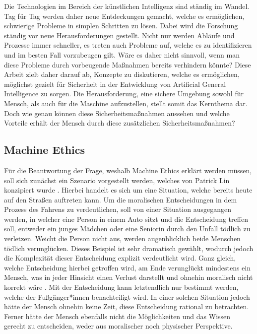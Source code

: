             Die Technologien im Bereich der künstlichen Intelligenz sind ständig im Wandel. Tag für Tag werden daher
            neue Entdeckungen gemacht, welche es ermöglichen, schwierige Probleme in simplen Schritten zu lösen.
            Dabei wird die Forschung ständig vor neue Herausforderungen gestellt. Nicht nur werden Abläufe und Prozesse
            immer schneller, es treten auch Probleme auf, welche es zu identifizieren und im besten Fall vorzubeugen gilt.
            Wäre es daher nicht sinnvoll, wenn man diese Probleme durch vorbeugende Maßnahmen bereits verhindern könnte?
            Diese Arbeit zielt daher darauf ab, Konzepte zu diskutieren, welche es ermöglichen, möglichst gezielt für
            Sicherheit in der Entwicklung von Artificial General Intelligence zu sorgen. Die Herausforderung, eine sichere
            Umgebung sowohl für Mensch, als auch für die Maschine aufzustellen, stellt somit das Kernthema dar. Doch wie
            genau können diese Sicherheitsmaßnahmen aussehen und welche Vorteile erhält der Mensch durch diese zusätzlichen
            Sicherheitsmaßnahmen?

        \subsection{Machine Ethics}
            Für die Beantwortung der Frage, weshalb Machine Ethics erklärt werden müssen, soll sich zunächst ein Szenario
            vorgestellt werden, welches von Patrick Lin konzipiert wurde \cite[s. 70]{maurer_gerdes_lenz_winner_2015}.
            Hierbei handelt es sich um eine Situation, welche bereits heute auf den Straßen auftreten kann. Um die
            moralischen Entscheidungen in dem Prozess des Fahrens zu verdeutlichen, soll von einer Situation ausgegangen
            werden, in welcher eine Person in einem Auto sitzt und die Entscheidung treffen soll, entweder ein junges
            Mädchen oder eine Seniorin durch den Unfall tödlich zu verletzen. Weicht die Person nicht aus, werden augenblicklich
            beide Menschen tödlich verunglücken. Dieses Beispiel ist sehr dramatisch gewählt, wodurch jedoch die Komplexität
            dieser Entscheidung explizit verdeutlicht wird. Ganz gleich, welche Entscheidung hierbei getroffen wird, am
            Ende verunglückt mindestens ein Mensch, was in jeder Hinsicht einen Verlust darstellt und ohnehin moralisch
            nicht korrekt wäre \cite[s. 70]{maurer_gerdes_lenz_winner_2015}. Mit der Entscheidung kann letztendlich nur
            bestimmt werden, welche der Fußgänger*innen benachteiligt wird. In einer solchen Situation jedoch hätte der
            Mensch ohnehin keine Zeit, diese Entscheidung rational zu betrachten. Ferner hätte der Mensch ebenfalls nicht
            die Möglichkeiten und das Wissen gerecht zu entscheiden, weder aus moralischer noch physischer Perspektive.

